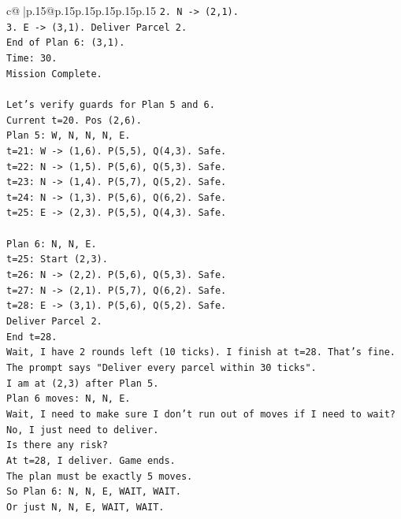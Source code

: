 \documentclass{article}
\begin{document}
{\begin{supertabular}{c@{$\;$}|p{.15\linewidth}@{}p{.15\linewidth}p{.15\linewidth}p{.15\linewidth}p{.15\linewidth}p{.15\linewidth}}
{{{\texttt{2. N {-}> (2,1).} \\
\texttt{3. E {-}> (3,1). Deliver Parcel 2.} \\
\texttt{End of Plan 6: (3,1).} \\
\texttt{Time: 30.} \\
\texttt{Mission Complete.} \\
\\ 
\texttt{Let's verify guards for Plan 5 and 6.} \\
\texttt{Current t=20. Pos (2,6).} \\
\texttt{Plan 5: W, N, N, N, E.} \\
\texttt{t=21: W {-}> (1,6). P(5,5), Q(4,3). Safe.} \\
\texttt{t=22: N {-}> (1,5). P(5,6), Q(5,3). Safe.} \\
\texttt{t=23: N {-}> (1,4). P(5,7), Q(5,2). Safe.} \\
\texttt{t=24: N {-}> (1,3). P(5,6), Q(6,2). Safe.} \\
\texttt{t=25: E {-}> (2,3). P(5,5), Q(4,3). Safe.} \\
\\ 
\texttt{Plan 6: N, N, E.} \\
\texttt{t=25: Start (2,3).} \\
\texttt{t=26: N {-}> (2,2). P(5,6), Q(5,3). Safe.} \\
\texttt{t=27: N {-}> (2,1). P(5,7), Q(6,2). Safe.} \\
\texttt{t=28: E {-}> (3,1). P(5,6), Q(5,2). Safe.} \\
\texttt{Deliver Parcel 2.} \\
\texttt{End t=28.} \\
\texttt{Wait, I have 2 rounds left (10 ticks). I finish at t=28. That's fine.} \\
\texttt{The prompt says "Deliver every parcel within 30 ticks".} \\
\texttt{I am at (2,3) after Plan 5.} \\
\texttt{Plan 6 moves: N, N, E.} \\
\texttt{Wait, I need to make sure I don't run out of moves if I need to wait? No, I just need to deliver.} \\
\texttt{Is there any risk?} \\
\texttt{At t=28, I deliver. Game ends.} \\
\texttt{The plan must be exactly 5 moves.} \\
\texttt{So Plan 6: N, N, E, WAIT, WAIT.} \\
\texttt{Or just N, N, E, WAIT, WAIT.} \\
}}}
\end{supertabular}}
\end{document}
